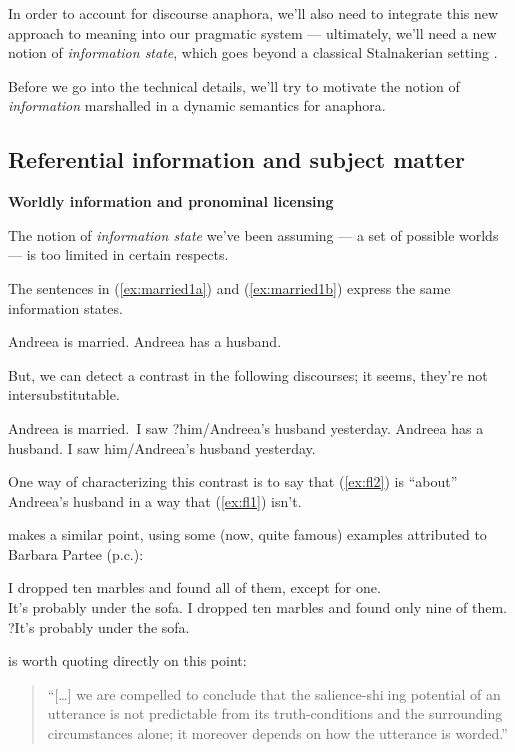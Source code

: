 \documentclass[nols,twoside,nofonts,nobib,nohyper]{tufte-handout}
\theoremstyle{definition}
\begin{document}
In order to account for discourse anaphora, we'll also need to integrate this new approach to meaning into our pragmatic system --- ultimately, we'll need a new notion of \textit{information state}, which goes beyond a classical Stalnakerian setting \citep{Stalnaker1976}.

Before we go into the technical details, we'll try to motivate the notion of \textit{information} marshalled in a dynamic semantics for anaphora.

\subsection{Referential information and subject matter}

\textbf{Worldly information and pronominal licensing}

The notion of \textit{information state} we've been assuming --- a set of possible worlds --- is too limited in certain respects.

The sentences in (\ref{ex:married1a}) and (\ref{ex:married1b}) express the same information states.

\pex
\a Andreea is married.\label{ex:married1a}
\a Andreea has a husband.\label{ex:married1b}
\xe

But, we can detect a contrast in the following discourses; it seems, they're not intersubstitutable.

\pex
\a Andreea is married. I saw ?him/Andreea's husband yesterday.\label{ex:fl1}
\a Andreea has a husband. I saw him/Andreea's husband yesterday.\label{ex:fl2}
\xe

One way of characterizing this contrast is to say that (\ref{ex:fl2}) is \enquote{about} Andreea's husband in a way that (\ref{ex:fl1}) isn't.

\citet[p. 21]{Heim1982} makes a similar point, using some (now, quite famous) examples attributed to Barbara Partee (p.c.):

\pex
\a I dropped ten marbles and found all of them, except for one.\\
It's probably under the sofa.
\a I dropped ten marbles and found only nine of them.\\
?It's probably under the sofa.
\xe

\citet{Heim1982} is worth quoting directly on this point:

\begin{quotation}\enquote{[…] we are compelled to conclude that the salience-shiing potential of an utterance is not predictable from its truth-conditions and the surrounding
circumstances alone; it moreover depends on how the utterance is worded.}
\end{quotation}
\end{document}
